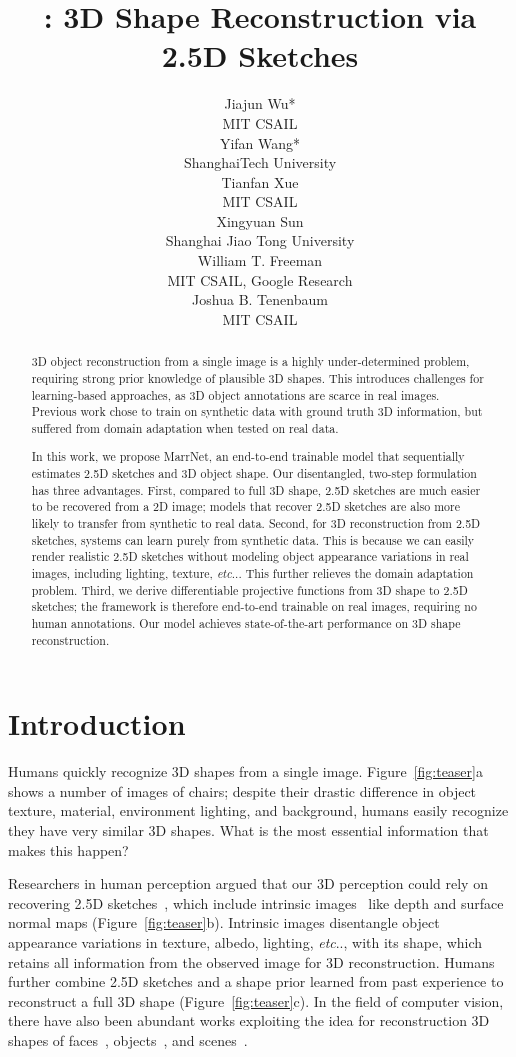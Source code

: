 \documentclass{article}
\title{\model: 3D Shape Reconstruction via 2.5D Sketches}
\author{
    Jiajun Wu*\\
    MIT CSAIL\\
    \And
    Yifan Wang*\\
    ShanghaiTech University\\
    \And
    Tianfan Xue\\
    MIT CSAIL\\
    \And
    Xingyuan Sun\\
    Shanghai Jiao Tong University\\
    \And
    William T. Freeman \\
    MIT CSAIL, Google Research \\
    \And
    Joshua B. Tenenbaum \\
    MIT CSAIL
}
\makeatletter
\newcommand{\fig}[1]{Figure~\ref{#1}}
\DeclareRobustCommand\onedot{\futurelet\@let@token\@onedot}
\def\@onedot{\ifx\@let@token.\else.\null\fi\xspace}
\def\etc{\emph{etc}\onedot} \def\vs{\emph{vs}\onedot}
\newcommand{\model}{MarrNet\xspace}
\makeatother
\begin{document}
\maketitle
{} 

\vspace{-10pt}
\begin{abstract}

3D object reconstruction from a single image is a highly under-determined problem, requiring strong prior knowledge of plausible 3D shapes. This introduces challenges for learning-based approaches, as 3D object annotations are scarce in real images. Previous work chose to train on synthetic data with ground truth 3D information, but suffered from domain adaptation when tested on real data.

In this work, we propose \model, an end-to-end trainable model that sequentially estimates 2.5D sketches and 3D object shape. Our disentangled, two-step formulation has three advantages. First, compared to full 3D shape, 2.5D sketches are much easier to be recovered from a 2D image; models that recover 2.5D sketches are also more likely to transfer from synthetic to real data. Second, for 3D reconstruction from 2.5D sketches, systems can learn purely from synthetic data. This is because we can easily render realistic 2.5D sketches without modeling object appearance variations in real images, including lighting, texture, \etc. This further relieves the domain adaptation problem. Third, we derive differentiable projective functions from 3D shape to 2.5D sketches; the framework is therefore end-to-end trainable on real images, requiring no human annotations. Our model achieves state-of-the-art performance on 3D shape reconstruction. 

\end{abstract} \section{Introduction}
\label{sec:intro}

Humans quickly recognize 3D shapes from a single image. \fig{fig:teaser}a shows a number of images of chairs; despite their drastic difference in object texture, material, environment lighting, and background, humans easily recognize they have very similar 3D shapes. What is the most essential information that makes this happen?

Researchers in human perception argued that our 3D perception could rely on recovering 2.5D sketches~\citep{Marr1982}, which include intrinsic images~\citep{barrow,tappen2003recovering} like depth and surface normal maps (\fig{fig:teaser}b). Intrinsic images disentangle object appearance variations in texture, albedo, lighting, \etc, with its shape, which retains all information from the observed image for 3D reconstruction. Humans further combine 2.5D sketches and a shape prior learned from past experience to reconstruct a full 3D shape (\fig{fig:teaser}c). In the field of computer vision, there have also been abundant works exploiting the idea for reconstruction 3D shapes of faces~\citep{kemelmacher20113d}, objects~\citep{tappen2003recovering}, and scenes~\citep{Hoiem2005b,saxena2009make3d}.
\end{document}
